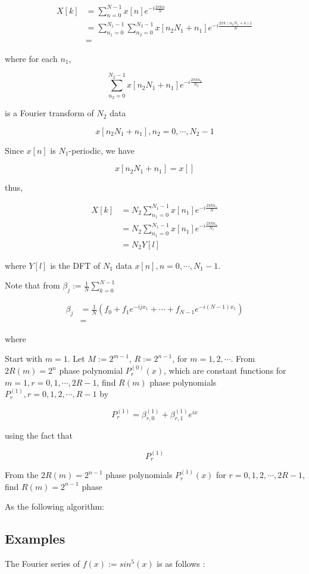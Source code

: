 \documentclass[12pt]{article}
\theoremstyle{nonumberbreak}
\begin{document}
$$
\begin{aligned}
X[k] &= \sum_{n=0}^{N-1} x[n] e^{-i\frac{2\pi kn}{N}} \\[8pt]
&= \sum_{n_1=0}^{N_1-1} \sum_{n_2=0}^{N_2-1} x[n_2 N_1 + n_1] e^{-i \frac{2\pi k (n_2 N_1 + n)1 }{N}} \\[8pt]
&= 
\end{aligned}
$$

where for each $n_1$,

$$
\sum_{n_2=0}^{N_2-1} x[n_2 N_1 + n_1] e^{-i \frac{2\pi kn_2}{N_2}}
$$

is a Fourier transform of $N_2$ data

$$
x[n_2 N_1 + n_1], n_2 = 0,\cdots, N_2 -1
$$

Since $x[n]$ is $N_1$-periodic, we have

$$
x[n_2 N_1 + n_1] = x[]
$$

thus,


$$
\begin{aligned}
X[k] &= N_2 \sum_{n_1=0}^{N_1 -1} x[n_1] e^{-i\frac{2\pi k n_1}{N}} \\[8pt]
&= N_2 \sum_{n_1=0}^{N_1-1} x[n_1] e^{-i \frac{2\pi k n_1}{N_1}} \\[8pt]
&= N_2 Y[l]
\end{aligned}
$$

where $Y[l]$ is the DFT of $N_1$ data $x[n], n=0,\cdots,N_1-1$. 



Note that from $\beta_j := \frac{1}{N} \sum_{k=0}^{N-1}$

$$
\begin{aligned}
\beta_j &= \frac{1}{N} \left( f_0 + f_1 e^{-ijx_1} + \cdots + f_{N-1} e^{-i(N-1)x_1} \right) \\[8pt]
&= 
\end{aligned}
$$

where


Start with $m=1$. Let $M:= 2^{m-1}$, $R:= 2^{n-1}$, for $m=1,2,\cdots$. From $2R(m) = 2^n$ phase polynomial $P_r^{(0)}(x)$, which are constant functions for $m=1, r=0,1,\cdots,2R-1$, find $R(m)$ phase polynomials $P_r^{(1)}, r=0,1,2,\cdots,R-1$ by

$$
P_r^{(1)} = \beta_{r,0}^{(1)} + \beta_{r,1}^{(1)} e^{ix}
$$

using the fact that 

$$
P_r^{(1)}
$$


From the $2R(m) = 2^{n-1}$ phase polynomials $P_r^{(1)} (x)$ for $r=0,1,2,\cdots,2R-1$, find $R(m) = 2^{n-1}$ phase 









As the following algorithm: 


\subsection*{Examples}


The Fourier series of $f(x):= sin^5(x)$ is as follows :
\end{document}
